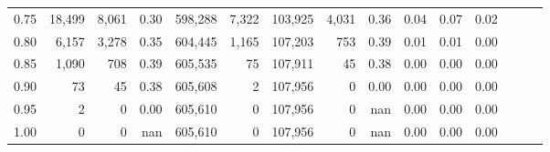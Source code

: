 \begin{tabular}{rrrrrrrrrrrrrrr}
0.75 &  18,499 &   8,061 &  0.30 &  598,288 &    7,322 &  103,925 &    4,031 &  0.36 &  0.04 &  0.07 &      0.02 \\
0.80 &   6,157 &   3,278 &  0.35 &  604,445 &    1,165 &  107,203 &      753 &  0.39 &  0.01 &  0.01 &      0.00 \\
0.85 &   1,090 &     708 &  0.39 &  605,535 &       75 &  107,911 &       45 &  0.38 &  0.00 &  0.00 &      0.00 \\
0.90 &      73 &      45 &  0.38 &  605,608 &        2 &  107,956 &        0 &  0.00 &  0.00 &  0.00 &      0.00 \\
0.95 &       2 &       0 &  0.00 &  605,610 &        0 &  107,956 &        0 &   nan &  0.00 &  0.00 &      0.00 \\
1.00 &       0 &       0 &   nan &  605,610 &        0 &  107,956 &        0 &   nan &  0.00 &  0.00 &      0.00 \\
\bottomrule
\end{tabular}
